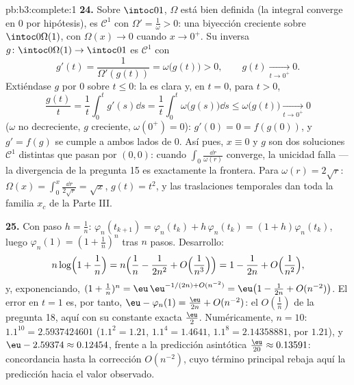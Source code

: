 \begin{solution}{pb:b3:complete:1}
\textbf{24.} Sobre $\intoc01$, $\Omega$ está bien definida (la integral
converge en $0$ por hipótesis), es $\mathcal C^1$ con
$\Omega' = \frac1\omega > 0$: una biyección creciente sobre
$\intoc0{\Omega(1)}$, con $\Omega(x) \to 0$ cuando $x \to 0^+$. Su
inversa $g \colon \intoc0{\Omega(1)} \to \intoc01$ es $\mathcal C^1$ con
\[
g'(t) = \frac1{\Omega'(g(t))} = \omega\bigl(g(t)\bigr) > 0,
\qquad g(t) \xrightarrow[t \to 0^+]{} 0 .
\]
Extiéndase $g$ por $0$ sobre $t \leq 0$: la
 es clara y, en $t = 0$,
para $t > 0$,
\[
\frac{g(t)}t = \frac1t\int_0^tg'(s)\dd s
= \frac1t\int_0^t\omega\bigl(g(s)\bigr)\dd s
\leq \omega\bigl(g(t)\bigr) \xrightarrow[t\to0^+]{} 0
\]
($\omega$ no decreciente, $g$ creciente, $\omega(0^+) = 0$):
$g'(0) = 0 = f(g(0))$, y $g' = f(g)$ se cumple a ambos lados de $0$. Así
pues, $x \equiv 0$ y $g$ son dos soluciones $\mathcal
C^1$ distintas que pasan por $(0, 0)$: cuando $\int_0\frac{\dd r}
{\omega(r)}$ converge, la unicidad falla --- la divergencia de la
pregunta 15 es exactamente la frontera. Para $\omega(r) = 2\sqrt
r$: $\Omega(x) = \int_0^x\frac{\dd r}{2\sqrt r} = \sqrt x$,
$g(t) = t^2$, y las traslaciones temporales dan toda la familia $x_c$ de
la Parte III.

\textbf{25.} Con paso $h = \frac1n$: $\varphi_n(t_{k+1}) =
\varphi_n(t_k) + h\,\varphi_n(t_k) = (1 + h)\varphi_n(t_k)$, luego
$\varphi_n(1) = (1 + \frac1n)^n$ tras $n$ pasos. Desarrollo:
\[
n\log\Bigl(1 + \frac1n\Bigr)
= n\Bigl(\frac1n - \frac1{2n^2} + O\Bigl(\frac1{n^3}\Bigr)
\Bigr) = 1 - \frac1{2n} + O\Bigl(\frac1{n^2}\Bigr),
\]
y, exponenciando, $(1 + \frac1n)^n = \eu\,\eu^{-1/(2n) +
O(n^{-2})} = \eu\bigl(1 - \frac1{2n} + O(n^{-2})\bigr)$. El error en
$t = 1$ es, por tanto, $\eu - \varphi_n(1) =
\frac{\eu}{2n} + O(n^{-2})$: el $O(\frac1n)$ de la pregunta 18, aquí con
su constante exacta $\frac\eu2$. Numéricamente, $n =
10$: $1.1^{10} = 2.5937424601$ ($1.1^2 = 1.21$, $1.1^4 =
1.4641$, $1.1^8 = 2.14358881$, por $1.21$), y $\eu -
2.59374 \approx 0.12454$, frente a la predicción asintótica
$\frac{\eu}{20} \approx 0.13591$: concordancia hasta la corrección
$O(n^{-2})$, cuyo término principal rebaja aquí la predicción hacia el
valor observado.
\end{solution}
